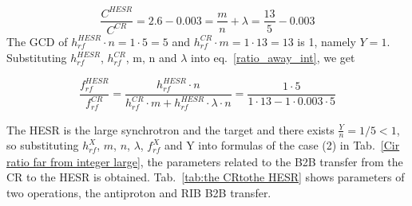 \begin{equation}
\frac{C^{\mathit{HESR}}}{C^{\mathit{CR}}}=2.6-0.003=\frac{m}{n}+ \lambda = \frac{13}{5}-0.003
\end{equation}
The GCD of $h^{\mathit{HESR}}_\mathit{rf}\cdot n=1\cdot5=5$ and $h^{\mathit{CR}}_\mathit{rf} \cdot m=1\cdot 13=13$ is 1, namely $Y=1$. Substituting $h^{\mathit{HESR}}_\mathit{rf}$, $h^{\mathit{CR}}_\mathit{rf}$, m, n and $\lambda$ into eq.~\ref{ratio_away_int}, we get

\begin{equation} 
\frac{f_{\mathit{rf}}^{\mathit{HESR}}}{f_{\mathit{rf}}^{\mathit{CR}}}=\frac{h^{\mathit{HESR}}_\mathit{rf}\cdot n}{h^{\mathit{CR}}_\mathit{rf} \cdot m+ h^{\mathit{HESR}}_\mathit{rf} \cdot\lambda\cdot n}=\frac{1\cdot 5}{1 \cdot 13- 1 \cdot 0.003\cdot 5}
\end{equation}

The HESR is the large synchrotron and the target and there exists $\frac{Y}{n}=1/5<1$, so substituting $h^X_\mathit{rf}$, $m$, $n$, $\lambda$, $f_{\mathit{rf}}^{X}$ and Y into formulas of the case (2) in Tab.~\ref{Cir ratio far from integer large}, the parameters related to the B2B transfer from the CR to the HESR is obtained. Tab.~\ref{tab:the CRtothe HESR} shows parameters of two operations, the antiproton and RIB B2B transfer.


